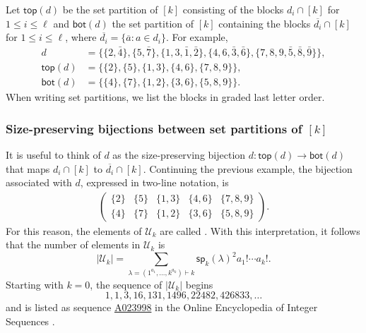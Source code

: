 Let $\mathsf{top}(d)$ be the set partition of $[k]$ consisting of the blocks $d_i \cap [k]$
for $1 \leqslant i \leqslant \ell$ and $\mathsf{bot}(d)$ the set
partition of $[k]$ containing the blocks $\overline{d_i} \cap [k]$
for $1 \leqslant i \leqslant \ell$, where $\overline{d_i} = \{ \overline{a} : a \in d_i\}$. For example,
\begin{align*}
    d & = \{ \{2,\bar{4} \}, \{5,\bar{7} \}, \{1,3,\bar{1},\bar{2} \}, \{4,6,\bar{3}, \bar{6}\}, \{7, 8, 9, \bar{5}, \bar{8}, \bar{9} \}  \},\\
\mathsf{top}(d) &=\{\{2\}, \{5\}, \{ 1,3\},  \{4, 6\},  \{7, 8, 9\}\},\\
\mathsf{bot}(d) &=\{ \{ 4\}, \{7\},  \{1,2\},\{3,6\},  \{5, 8, 9\}\}.
\end{align*}
When writing set partitions, we list the blocks in graded last letter order.

\subsubsection{Size-preserving bijections between set partitions of $[k]$}
\label{sssection:bijection}
It is useful to think of $d$ as the size-preserving bijection $d \colon
\mathsf{top}(d) \rightarrow \mathsf{bot}(d)$ that maps
$d_i \cap [k]$ to $\overline{d_i} \cap [k]$.
Continuing the previous example, the bijection associated with $d$, expressed
in two-line notation, is
\begin{align*}
    \left(
        \begin{array}{ccccc}
            \{2\} & \{5\} & \{ 1,3\} & \{4, 6\} & \{7, 8, 9\}\\
            \{4\} & \{7\} & \{1,2\}  & \{3,6\}  & \{5, 8, 9\}
        \end{array}
    \right).
\end{align*}
For this reason, the elements of $\mathcal{U}_k$ are called . With this interpretation, it follows that the number of elements
in $\mathcal{U}_k$ is
\[
     |\mathcal{U}_k| = \sum_{\lambda = (1^{a_1}, \ldots, k^{a_k})\vdash k} \mathsf{sp}_k(\lambda)^2 a_1! \cdots a_k!.
\]
Starting with $k=0$, the sequence of $ |\mathcal{U}_k|$ begins
\[
1, 1, 3, 16, 131, 1496, 22482, 426833,\ldots
\]
and is listed as sequence \href{https://oeis.org/A023998}{A023998}
in the Online Encyclopedia of Integer Sequences \cite{OEIS}.

